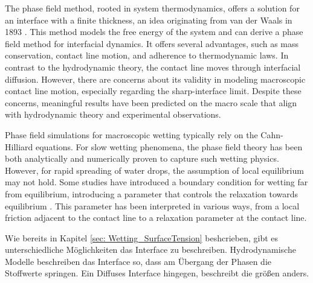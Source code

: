 The phase field method, rooted in system thermodynamics, offers a solution for an interface with a finite thickness, an idea originating from van der Waals in 1893 \cite{vanderwaals1979ThermodynamicTheoryCapillarity}. This method models the free energy of the system and can derive a phase field method for interfacial dynamics. It offers several advantages, such as mass conservation, contact line motion, and adherence to thermodynamic laws. In contrast to the hydrodynamic theory, the contact line moves through interfacial diffusion. However, there are concerns about its validity in modeling macroscopic contact line motion, especially regarding the sharp-interface limit. Despite these concerns, meaningful results have been predicted on the macro scale that align with hydrodynamic theory and experimental observations\cite{yue2010SharpinterfaceLimitCahn,yue2011CanDiffuseinterfaceModels,carlson2011DissipationRapidDynamic}.


Phase field simulations for macroscopic wetting typically rely on the Cahn-Hilliard equations. For slow wetting phenomena, the phase field theory has been both analytically \cite{jacqmin2000ContactlineDynamicsDiffuse} and numerically \cite{yue2011CanDiffuseinterfaceModels,yue2010SharpinterfaceLimitCahn} proven to capture such wetting physics. However, for rapid spreading of water drops, the assumption of local equilibrium may not hold. Some studies have introduced a boundary condition for wetting far from equilibrium, introducing a parameter that controls the relaxation towards equilibrium . This parameter has been interpreted in various ways, from a local friction adjacent to the contact line to a relaxation parameter at the contact line\cite{yue2011WallEnergyRelaxation}\cite{carlsonCapillarityDynamicWetting2012}.


Wie bereits in Kapitel \ref{sec: Wetting_SurfaceTension} beshcrieben, gibt es unterschiedliche Möglichkeiten das Interface zu beschreiben. Hydrodynamische Modelle beschreiben das Interface so, dass am Übergang der Phasen die Stoffwerte springen. Ein Diffuses Interface hingegen, beschreibt die größen anders. 

